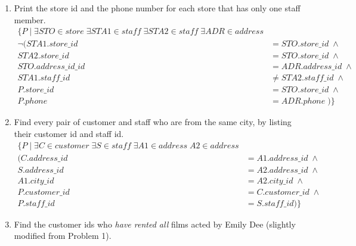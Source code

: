 \documentclass[paper=a4, fontsize=11pt]{scrartcl} %
\numberwithin{figure}{section} %
\numberwithin{table}{section} %
\begin{document}
\begin{enumerate}
\begin{enumerate}
\item Print the store id and the phone number for each store that has only one staff member.
\begin{equation*}
\begin{aligned}
 \{ P \; | \; \exists STO \in store \; \exists STA1 \in staff \; \exists STA2 \in staff \; \exists ADR \in address\\
 \neg(STA1.store\_id &= STO.store\_id \; \wedge \\
 STA2.store\_id &= STO.store\_id \; \wedge \\
 STO.address\_id\_id &= ADR.address\_id \; \wedge  \\
 STA1.staff\_id &\neq STA2.staff\_id \; \wedge \\
 P.store\_id &= STO.store\_id \; \wedge \\
P.phone &= ADR.phone \; )  \}
\end{aligned}
\end{equation*}

\item Find every pair of customer and staff who are from the same city, by listing their customer id and staff id.
\begin{equation*}
\begin{aligned}
\{ P \; | \; \exists C \in customer \; \exists S \in staff \; \exists A1 \in address \; A2 \in address\\
(C.address\_id &= A1.address\_id \; \wedge\\
 S.address\_id &= A2.address\_id \; \wedge\\
 A1.city\_id &= A2.city\_id \; \wedge\\
 P.customer\_id &= C.customer\_id \; \wedge\\
 P.staff\_id &= S.staff\_id )\}
\end{aligned}
\end{equation*}

\item Find the customer ids who \textit{have rented all} films acted by Emily Dee (slightly modified from Problem 1).

\end{enumerate}

\end{enumerate}
\end{document}
